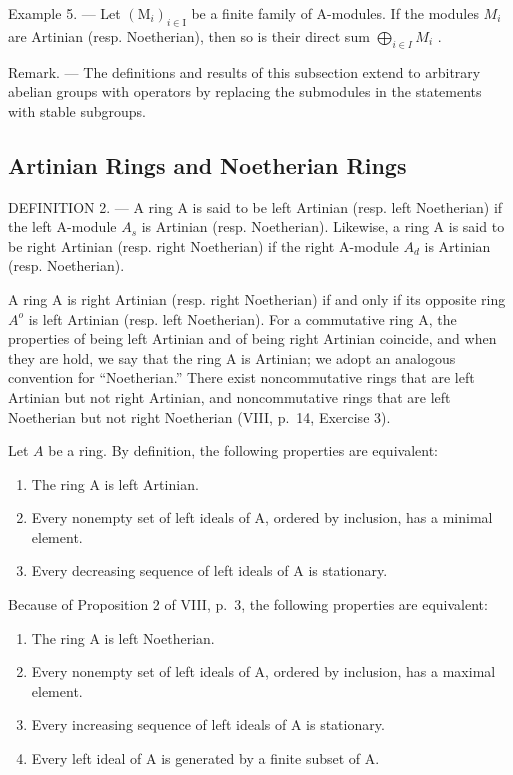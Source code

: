 Example 5. --- Let \((\mathrm{M}_{i})_{i\in\mathrm{I}}\) be a finite family of A-modules. If the modules \(M_{i}\) are Artinian (resp. Noetherian), then so is their direct sum \(\bigoplus_{i\in I} M_{i}\) .

Remark. --- The definitions and results of this subsection extend to arbitrary abelian groups with operators by replacing the submodules in the statements with stable subgroups.

\subsection{Artinian Rings and Noetherian Rings}

DEFINITION 2. --- A ring A is said to be left Artinian (resp. left Noetherian) if the left A-module \(A_{s}\) is Artinian (resp. Noetherian). Likewise, a ring A is said to be right Artinian (resp. right Noetherian) if the right A-module \(A_{d}\) is Artinian (resp. Noetherian).

A ring A is right Artinian (resp. right Noetherian) if and only if its opposite ring \(A^{o}\) is left Artinian (resp. left Noetherian). For a commutative ring A, the properties of being left Artinian and of being right Artinian coincide, and when they are hold, we say that the ring A is Artinian; we adopt an analogous convention for ``Noetherian.'' There exist noncommutative rings that are left Artinian but not right Artinian, and noncommutative rings that are left Noetherian but not right Noetherian (VIII, p.~14, Exercise 3).

Let \(A\) be a ring. By definition, the following properties are equivalent:

\begin{enumerate}
\def\labelenumi{(\roman{enumi})}
\item
  The ring A is left Artinian.
\item
  Every nonempty set of left ideals of A, ordered by inclusion, has a minimal element.
\item
  Every decreasing sequence of left ideals of A is stationary.
\end{enumerate}

Because of Proposition 2 of VIII, p.~3, the following properties are equivalent:

\begin{enumerate}
\def\labelenumi{(\roman{enumi})}
\item
  The ring A is left Noetherian.
\item
  Every nonempty set of left ideals of A, ordered by inclusion, has a maximal element.
\item
  Every increasing sequence of left ideals of A is stationary.
\item
  Every left ideal of A is generated by a finite subset of A.
\end{enumerate}

